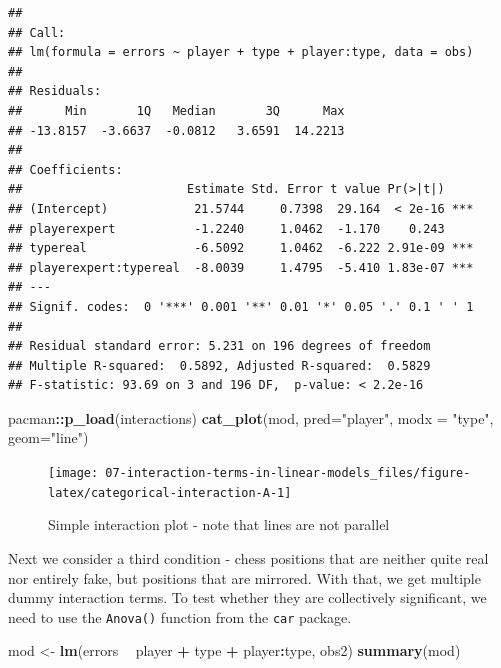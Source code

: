 \documentclass[
]{book}
\newenvironment{Shaded}{\begin{snugshade}}{\end{snugshade}}
\newcommand{\DataTypeTok}[1]{\textcolor[rgb]{0.13,0.29,0.53}{#1}}
\newcommand{\KeywordTok}[1]{\textcolor[rgb]{0.13,0.29,0.53}{\textbf{#1}}}
\newcommand{\NormalTok}[1]{#1}
\newcommand{\OperatorTok}[1]{\textcolor[rgb]{0.81,0.36,0.00}{\textbf{#1}}}
\newcommand{\StringTok}[1]{\textcolor[rgb]{0.31,0.60,0.02}{#1}}
\begin{document}
\begin{verbatim}
## 
## Call:
## lm(formula = errors ~ player + type + player:type, data = obs)
## 
## Residuals:
##      Min       1Q   Median       3Q      Max 
## -13.8157  -3.6637  -0.0812   3.6591  14.2213 
## 
## Coefficients:
##                       Estimate Std. Error t value Pr(>|t|)    
## (Intercept)            21.5744     0.7398  29.164  < 2e-16 ***
## playerexpert           -1.2240     1.0462  -1.170    0.243    
## typereal               -6.5092     1.0462  -6.222 2.91e-09 ***
## playerexpert:typereal  -8.0039     1.4795  -5.410 1.83e-07 ***
## ---
## Signif. codes:  0 '***' 0.001 '**' 0.01 '*' 0.05 '.' 0.1 ' ' 1
## 
## Residual standard error: 5.231 on 196 degrees of freedom
## Multiple R-squared:  0.5892,	Adjusted R-squared:  0.5829 
## F-statistic: 93.69 on 3 and 196 DF,  p-value: < 2.2e-16
\end{verbatim}

\begin{Shaded}
\begin{Highlighting}[]
\NormalTok{pacman}\OperatorTok{::}\KeywordTok{p_load}\NormalTok{(interactions)}
\KeywordTok{cat_plot}\NormalTok{(mod, }\DataTypeTok{pred=}\StringTok{"player"}\NormalTok{, }\DataTypeTok{modx =} \StringTok{"type"}\NormalTok{, }\DataTypeTok{geom=}\StringTok{"line"}\NormalTok{)}
\end{Highlighting}
\end{Shaded}

\begin{figure}

{\centering \texttt{[image: 07-interaction-terms-in-linear-models\_files/figure-latex/categorical-interaction-A-1]} 

}

\caption{Simple interaction plot - note that lines are not parallel}\label{fig:categorical-interaction-A}
\end{figure}

Next we consider a third condition - chess positions that are neither quite real nor entirely fake, but positions that are mirrored. With that, we get multiple dummy interaction terms. To test whether they are collectively significant, we need to use the \texttt{Anova()} function from the \texttt{car} package.

\begin{Shaded}
\begin{Highlighting}[]
\NormalTok{mod <-}\StringTok{ }\KeywordTok{lm}\NormalTok{(errors }\OperatorTok{~}\StringTok{ }\NormalTok{player }\OperatorTok{+}\StringTok{ }\NormalTok{type }\OperatorTok{+}\StringTok{ }\NormalTok{player}\OperatorTok{:}\NormalTok{type, obs2)}
\KeywordTok{summary}\NormalTok{(mod)}
\end{Highlighting}
\end{Shaded}
\end{document}
